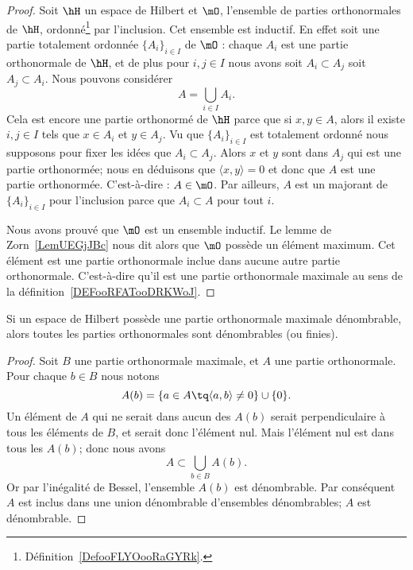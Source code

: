 \begin{proof}
	Soit \( \hH\) un espace de Hilbert et \( \mO\), l'ensemble de parties orthonormales de \( \hH\), ordonné\footnote{Définition~\ref{DefooFLYOooRaGYRk}.} par l'inclusion. Cet ensemble est inductif. En effet soit une partie totalement ordonnée \( \{ A_i \}_{i\in I}\) de \( \mO\) : chaque \( A_i\) est une partie orthonormale de \( \hH\), et de plus pour \( i,j\in I\) nous avons soit \( A_i\subset A_j\) soit \( A_j\subset A_i\). Nous pouvons considérer
	\begin{equation}
		A=\bigcup_{i\in I}A_i.
	\end{equation}
	Cela est encore une partie orthonormé de \( \hH\) parce que si \( x,y\in A\), alors il existe \( i,j\in I\) tels que \( x\in A_i\) et \( y\in A_j\). Vu que \( \{ A_i \}_{i\in I}\) est totalement ordonné nous supposons pour fixer les idées que \( A_i\subset A_j\). Alors \(x \) et \( y\) sont dans \( A_j\) qui est une partie orthonormée; nous en déduisons que \( \langle x, y\rangle =0\) et donc que \( A\) est une partie orthonormée. C'est-à-dire : \( A\in \mO\). Par ailleurs, \( A\) est un majorant de \( \{ A_i \}_{i\in I}\) pour l'inclusion parce que \( A_i\subset A\) pour tout \( i\).

	Nous avons prouvé que \( \mO\) est un ensemble inductif. Le lemme de Zorn~\ref{LemUEGjJBc} nous dit alors que \( \mO\) possède un élément maximum. Cet élément est une partie orthonormale inclue dans aucune autre partie orthonormale. C'est-à-dire qu'il est une partie orthonormale maximale au sens de la définition~\ref{DEFooRFATooDRKWoJ}.
\end{proof}

\begin{proposition}      \label{PROPooENTIooIplRAS}
	Si un espace de Hilbert possède une partie orthonormale maximale dénombrable, alors toutes les parties orthonormales sont dénombrables (ou finies).
\end{proposition}

\begin{proof}
	Soit \( B\) une partie orthonormale maximale, et \( A\) une partie orthonormale. Pour chaque \( b\in B\) nous notons
	\begin{equation}
		A(b)=\{ a\in A\tq \langle a, b\rangle \neq 0 \}\cup\{ 0 \}.
	\end{equation}
	Un élément de \( A\) qui ne serait dans aucun des \( A(b)\) serait perpendiculaire à tous les éléments de \( B\), et serait donc l'élément nul. Mais l'élément nul est dans tous les \( A(b)\); donc nous avons
	\begin{equation}
		A\subset\bigcup_{b\in B}A(b).
	\end{equation}
	Or par l'inégalité de Bessel, l'ensemble \( A(b)\) est dénombrable. Par conséquent \( A\) est inclus dans une union dénombrable d'ensembles dénombrables; \( A\) est dénombrable.
\end{proof}

